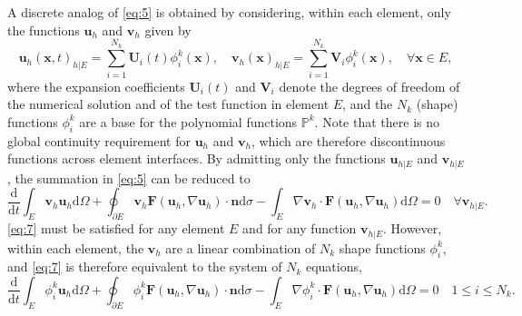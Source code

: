 \documentclass{develop-note}
\begin{document}
A discrete analog of \autoref{eq:5} is obtained by considering, within each element, only the functions $\mathbf{u}_{h}$ and $\mathbf{v}_{h}$ given by
\begin{equation}
  \mathbf{u}_{h}(\mathbf{x},t)_{h|E}=\sum_{i=1}^{N_{k}}\mathbf{U}_{i}(t)\phi_{i}^{k}(\mathbf{x}),\quad\mathbf{v}_{h}(\mathbf{x})_{h|E}=\sum_{i=1}^{N_{k}}\mathbf{V}_{i}\phi_{i}^{k}(\mathbf{x}),\quad\forall\mathbf{x}\in E,
\end{equation}
where the expansion coefficients $\mathbf{U}_{i}(t)$ and $\mathbf{V}_{i}$ denote the degrees of freedom of the numerical solution and of the test function in element $E$, and the $N_{k}$ (shape) functions $\phi_{i}^{k}$ are a base for the polynomial functions $\mathbb{P}^{k}$. Note that there is no global continuity requirement for $\mathbf{u}_{h}$ and $\mathbf{v}_{h}$, which are therefore discontinuous functions across element interfaces. By admitting only the functions $\mathbf{u}_{h|E}$ and $\mathbf{v}_{h|E}$, the summation in \autoref{eq:5} can be reduced to
\begin{equation}
  \label{eq:7}
  \dfrac{\mathrm{d}}{\mathrm{d}t}\int_{E}\mathbf{v}_{h}\mathbf{u}_{h}\mathrm{d}\Omega+\oint_{\partial E}\mathbf{v}_{h}\mathbf{F}(\mathbf{u}_{h},\nabla\mathbf{u}_{h})\cdot\mathbf{n}\mathrm{d}\sigma-\int_{E}\nabla\mathbf{v}_{h}\cdot\mathbf{F}(\mathbf{u}_{h},\nabla\mathbf{u}_{h})\mathrm{d}\Omega=0\quad\forall\mathbf{v}_{h|E}.
\end{equation}
\autoref{eq:7} must be satisfied for any element $E$ and for any function $\mathbf{v}_{h|E}$. However, within each element, the $\mathbf{v}_{h}$ are a linear combination of $N_{k}$ shape functions $\phi_{i}^{k}$, and \autoref{eq:7} is therefore equivalent to the system of $N_{k}$ equations,
\begin{equation}
  \label{eq:8}
  \dfrac{\mathrm{d}}{\mathrm{d}t}\int_{E}\phi_{i}^{k}\mathbf{u}_{h}\mathrm{d}\Omega+\oint_{\partial E}\phi_{i}^{k}\mathbf{F}(\mathbf{u}_{h},\nabla\mathbf{u}_{h})\cdot\mathbf{n}\mathrm{d}\sigma-\int_{E}\nabla\phi_{i}^{k}\cdot\mathbf{F}(\mathbf{u}_{h},\nabla\mathbf{u}_{h})\mathrm{d}\Omega=0\quad 1\leqslant i\leqslant N_{k}.
\end{equation}
\end{document}
